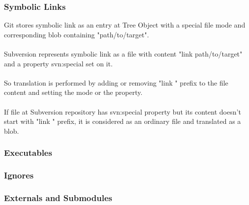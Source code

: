 \subsubsection{Symbolic Links}
Git stores symbolic link as an entry at Tree Object with a special file mode and corresponding blob containing "path/to/target".
\\\\
Subversion represents symbolic link as a file with content "link path/to/target" and a property svn:special set on it.
\\\\
So translation is performed by adding or removing "link " prefix to the file content and setting the mode or the property.
\\\\
If file at Subversion repository has svn:special property but its content doesn't start with "link " prefix, it is considered as an ordinary file and translated as a blob.
\subsubsection{Executables}
\subsubsection{Ignores}
\subsubsection{Externals and Submodules}